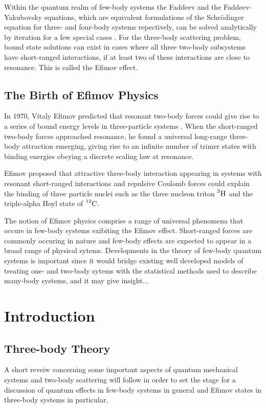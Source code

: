 \documentclass{article}
\begin{document}
Within the quantum realm of few-body systems the Faddeev and the Faddeev-Yakubovsky equations, which are equivalent formulations of the Schr{\"o}dinger equation for three- and four-body systems repectively, can be solved analytically by iteration for a few special cases \cite{Faddeev:1960su, Zubarev:1994}. For the three-body scattering problem, bound state solutions can exist in cases where all three two-body subsystems have short-ranged interactions, if at least two of these interactions are close to resonance. This is called the Efimov effect. 

\subsection{The Birth of Efimov Physics}
 In 1970, Vitaly Efimov predicted that resonant two-body forces could give rise to a series of bound energy levels in three-particle systems \cite{Efimov:1970zz}. When the short-ranged two-body forces approached resonance, he found a universal long-range three-body attraction emerging, giving rise to an infinite number of trimer states with binding energies obeying a discrete scaling law at resonance.  
 
 Efimov proposed that attractive three-body interaction appearing in systems with resonant short-ranged interactions and repulsive Coulomb forces could explain the binding of three particle nuclei such as the three nucleon triton $\prescript{3}{}{\mathrm{H}}$ and the triple-alpha Hoyl state of $\prescript{12}{}{\mathrm{C}}$.

The notion of Efimov physics comprise a range of universal phenomena that occurs in few-body systems exibiting the Efimov effect. Short-ranged forces are commonly occuring in nature and few-body effects are expected to appear in a broad range of physical sytems. Developments in the theory of few-body quantum systems is important since it would bridge existing well developed models of treating one- and two-body sytems with the statistical methods used to describe many-body systems, and it may give insight... 

\section{Introduction} 
\subsection{Three-body Theory}
A short reveiw concerning some important aspects of quantum mechanical systems and two-body scattering will follow in order to set the stage for a discussion of quantum effects in few-body systems in general and Efimov states in three-body systems in particular. 
\end{document}
